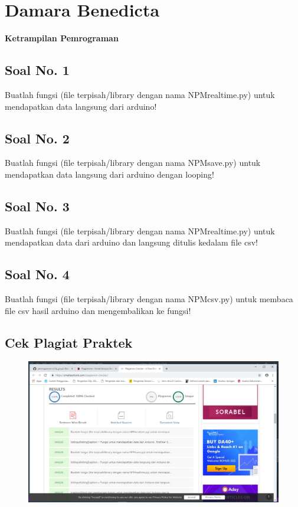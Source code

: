 \section{Damara Benedicta}
{\Large \textbf{Ketrampilan Pemrograman}}
\subsection{Soal No. 1}
Buatlah  fungsi  (file  terpisah/library  dengan  nama  NPMrealtime.py)  untuk mendapatkan data langsung dari arduino!



\subsection{Soal No. 2}
Buatlah fungsi (file terpisah/library dengan nama NPMsave.py) untuk mendapatkan data langsung dari arduino dengan looping!

\subsection{Soal No. 3}
Buatlah  fungsi  (file  terpisah/library  dengan  nama  NPMrealtime.py) untuk mendapatkan data dari arduino dan langsung ditulis kedalam file csv!



\subsection{Soal No. 4}
Buatlah fungsi (file terpisah/library dengan nama NPMcsv.py) untuk membaca file csv hasil arduino dan mengembalikan ke fungsi!


\subsection{Cek Plagiat Praktek}
\begin{figure}[H]
	\includegraphics[scale=0.2]{figures/5/1174012/SS.png}
	\centering
\end{figure}

